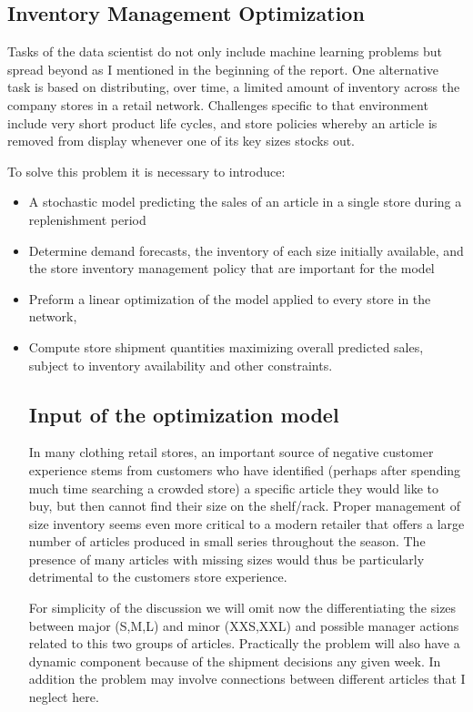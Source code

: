 \documentclass[11pt,fleqn]{book} %
\begin{document}
\begin{remark}

\chapter{Inventory Management Optimization}

Tasks of the data scientist do not only include machine learning problems but spread beyond as I mentioned in the beginning of the report. One alternative task is based on distributing, over time, a limited amount of inventory across the company stores in a retail network. Challenges specific to that environment include very short product life cycles, and store policies whereby an article is removed from display whenever one of its key sizes stocks out. 

To solve this problem it is necessary to introduce:
\begin{itemize}
\item A stochastic model predicting the sales of an article in a single store during a replenishment period
\item Determine demand forecasts, the inventory of each size initially available, and the store inventory management policy that are important for the model
\item Preform a linear optimization of the model applied to every store in the network, 
\item Compute store shipment quantities maximizing overall predicted sales, subject to inventory availability and other constraints. 

\section{Input of the optimization model}
In many clothing retail stores, an important source of negative customer experience stems from customers who have identified (perhaps after spending much time searching a crowded store) a specific article they would like to buy, but then cannot find their size on the shelf/rack. Proper management of size inventory seems even more critical to a modern retailer that offers a large number of articles produced in small series throughout the season. The presence of many articles with missing sizes would thus be particularly detrimental to the customers store experience. 
\begin{remark}
For simplicity of the discussion we will omit now the differentiating the sizes between major (S,M,L) and minor (XXS,XXL) and possible manager actions related to this two groups of articles. Practically the problem will also have a dynamic component because of the shipment decisions any given week. In addition the problem may involve connections between different articles that I neglect here.
\end{remark}


\end{itemize}
\end{remark}
\end{document}
